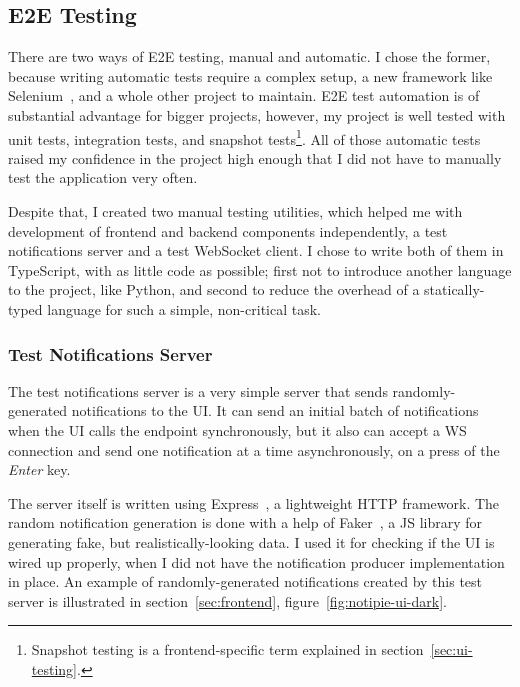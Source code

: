 \subsection{E2E Testing}\label{sec:e2e-testing}

There are two ways of E2E testing,
manual and automatic.
I chose the former,
because writing automatic tests
require a complex setup,
a new framework like Selenium~\cite{steward_selenium_2022},
and a whole other project to maintain.
E2E test automation is of substantial advantage
for bigger projects, however,
my project is well tested with
unit tests,
integration tests, and
snapshot tests\footnote{
  Snapshot testing is a frontend-specific term
  explained in section~\ref{sec:ui-testing}.
}.
All of those automatic tests
raised my confidence in the project high enough
that I did not have to manually test
the application very often.

Despite that,
I created two manual testing utilities,
which helped me with development
of frontend and backend components independently,
a test notifications server
and a test WebSocket client.
I chose to write both of them in TypeScript,
with as little code as possible;
first not to introduce another language
to the project, like Python,
and second to reduce the overhead
of a statically-typed language
for such a simple, non-critical task.

\subsubsection{Test Notifications Server}\label{sec:test-notifications-server}

The test notifications server
is a very simple server that sends
randomly-generated notifications to the UI.
It can send an initial batch of notifications
when the UI calls the endpoint synchronously,
but it also can accept a WS connection
and send one notification at a time asynchronously,
on a press of the \textit{Enter} key.

The server itself is written
using Express~\cite{holowaychuck_express_2022},
a lightweight HTTP framework.
The random notification generation
is done with a help of Faker~\cite{marak_faker_2022},
a JS library for generating fake,
but realistically-looking data.
I used it for checking if the UI
is wired up properly,
when I did not have
the notification producer
implementation in place.
An example of randomly-generated notifications
created by this test server is illustrated
in section~\ref{sec:frontend},
figure~\ref{fig:notipie-ui-dark}.

